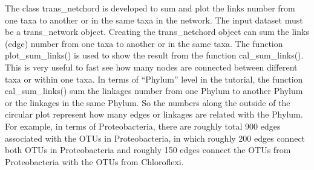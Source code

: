 \documentclass[
]{book}
\newenvironment{Shaded}{\begin{snugshade}}{\end{snugshade}}
\newcommand{\AttributeTok}[1]{\textcolor[rgb]{0.77,0.63,0.00}{#1}}
\newcommand{\CommentTok}[1]{\textcolor[rgb]{0.56,0.35,0.01}{\textit{#1}}}
\newcommand{\ConstantTok}[1]{\textcolor[rgb]{0.00,0.00,0.00}{#1}}
\newcommand{\DecValTok}[1]{\textcolor[rgb]{0.00,0.00,0.81}{#1}}
\newcommand{\FloatTok}[1]{\textcolor[rgb]{0.00,0.00,0.81}{#1}}
\newcommand{\FunctionTok}[1]{\textcolor[rgb]{0.00,0.00,0.00}{#1}}
\newcommand{\NormalTok}[1]{#1}
\newcommand{\OtherTok}[1]{\textcolor[rgb]{0.56,0.35,0.01}{#1}}
\newcommand{\SpecialCharTok}[1]{\textcolor[rgb]{0.00,0.00,0.00}{#1}}
\newcommand{\StringTok}[1]{\textcolor[rgb]{0.31,0.60,0.02}{#1}}
\begin{document}
The class trans\_netchord is developed to sum and plot the links number from one taxa to another or in the same taxa in the network.
The input dataset must be a trans\_network object.
Creating the trans\_netchord object can sum the links (edge) number from one taxa to another or in the same taxa.
The function plot\_sum\_links() is used to show the result from the function cal\_sum\_links().
This is very useful to fast see how many nodes are connected between different taxa or within one taxa.
In terms of ``Phylum'' level in the tutorial,
the function cal\_sum\_links() sum the linkages number from one Phylum to another Phylum or the linkages in the same Phylum.
So the numbers along the outside of the circular plot represent how many edges or linkages are related with the Phylum.
For example, in terms of Proteobacteria,
there are roughly total 900 edges associated with the OTUs in Proteobacteria,
in which roughly 200 edges connect both OTUs in Proteobacteria and roughly 150 edges connect the OTUs from Proteobacteria with the OTUs from Chloroflexi.

\begin{Shaded}
\end{Shaded}
\end{document}
